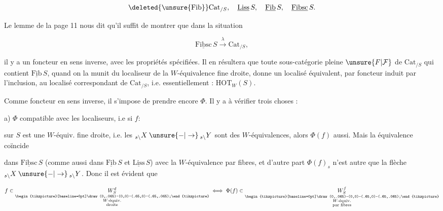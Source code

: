 \[
 \deleted{\unsure{\mathrm{Fib}}}\mathrm{Cat}_{/S},\quad \underline{\mathrm{Liss}}\,S,\quad \underline{\mathrm{Fib}}\,S,\quad \underline{\mathrm{Fibsc}}\,S .
\]

Le lemme de la page 11 nous dit  qu'il suffit de montrer que dans la situation

\[
 \underline{\mathrm{Fibsc}}\,S\xrightarrow{\lambda}\mathrm{Cat}_{/S},
\]

il y a un foncteur en sens inverse, avec les propriétés spécifiées. Il en résultera que toute sous-catégorie pleine $\unsure{F|\mathcal F}$ de $\mathrm{Cat}_{/S}$ qui contient $\underline{\mathrm{Fib}}\,S$, quand on la munit du localiseur de la $W$-équivalence fine droite, donne un localisé équivalent, par  foncteur induit par l'inclusion, au localisé correspondant de $\mathrm{Cat}_{/S}$, i.e. essentiellement : $\mathrm{HOT}_W(S)$.

Comme foncteur en sens inverse, il s'impose de prendre encore $\Phi$. Il y a à vérifier trois choses :

a) $\Phi$ compatible avec les localiseurs, i.e si $f\colon$


sur $S$ est une $W$-équiv. fine droite, i.e. les $ {}_{s\backslash}X\mathbin{\unsure{-|\to}}{}_{s\backslash}Y$ sont des $W$-équivalences, alors $\Phi(f)$ aussi. Mais la  équivalence coïncide


dans $\underline{\mathrm{Fibsc}}\,S$ (comme aussi dans $\underline{\mathrm{Fib}}\,S$ et $\underline{\mathrm{Liss}}\,S$) avec la $W$-équivalence par fibres, et d'autre part $\Phi(f)_s$ n'est autre que la flèche  $ {}_{s\backslash}X\mathbin{\unsure{-|\to}}{}_{s\backslash}Y$. Donc il est évident que 

\[
 f\in\underset{\substack{\begin{tikzpicture}[baseline=0pt]\draw (0,.065)--(0,0)--(.65,0)--(.65,.065);\end{tikzpicture}\\W\text{-équiv.}\\ \text{droite}}}{W_S^d}\iff
 \Phi(f)\in\underset{\substack{\begin{tikzpicture}[baseline=0pt]\draw (0,.065)--(0,0)--(.65,0)--(.65,.065);\end{tikzpicture}\\W\text{-équiv.}\\ \text{par fibres}}}{W_S^f}
\]

